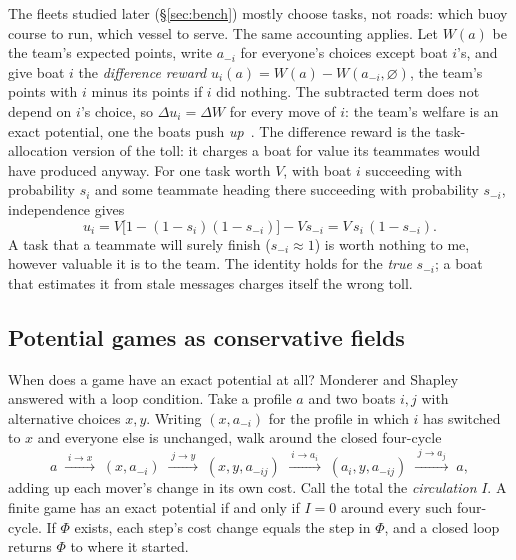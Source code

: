 \documentclass[11pt]{article}
\theoremstyle{definition}
\begin{document}
The fleets studied later (\S\ref{sec:bench}) mostly choose tasks, not roads: which buoy course to run, which vessel to serve. The same accounting applies. Let $W(a)$ be the team's expected points, write $a_{-i}$ for everyone's choices except boat $i$'s, and give boat $i$ the \emph{difference reward} $u_i(a)=W(a)-W(a_{-i},\varnothing)$, the team's points with $i$ minus its points if $i$ did nothing. The subtracted term does not depend on $i$'s choice, so $\Delta u_i=\Delta W$ for every move of $i$: the team's welfare is an exact potential, one the boats push \emph{up}~\cite{wolpert2001,marden2009}. The difference reward is the task-allocation version of the toll: it charges a boat for value its teammates would have produced anyway. For one task worth $V$, with boat $i$ succeeding with probability $s_i$ and some teammate heading there succeeding with probability $s_{-i}$, independence gives
\begin{equation}
u_i=V\big[1-(1-s_i)(1-s_{-i})\big]-V s_{-i}=V\,s_i\,(1-s_{-i}).\label{eq:dr}
\end{equation}
A task that a teammate will surely finish ($s_{-i}\approx1$) is worth nothing to me, however valuable it is to the team. The identity holds for the \emph{true} $s_{-i}$; a boat that estimates it from stale messages charges itself the wrong toll.

\subsection{Potential games as conservative fields}
\label{sec:curl}
When does a game have an exact potential at all? Monderer and Shapley~\cite{monderer1996} answered with a loop condition. Take a profile $a$ and two boats $i,j$ with alternative choices $x,y$. Writing $(x,a_{-i})$ for the profile in which $i$ has switched to $x$ and everyone else is unchanged, walk around the closed four-cycle
\[
a \;\xrightarrow{\;i\to x\;}\; (x,a_{-i}) \;\xrightarrow{\;j\to y\;}\; (x,y,a_{-ij}) \;\xrightarrow{\;i\to a_i\;}\; (a_i,y,a_{-ij}) \;\xrightarrow{\;j\to a_j\;}\; a,
\]
adding up each mover's change in its own cost. Call the total the \emph{circulation} $I$. A finite game has an exact potential if and only if $I=0$ around every such four-cycle. If $\Phi$ exists, each step's cost change equals the step in $\Phi$, and a closed loop returns $\Phi$ to where it started.
\end{document}
